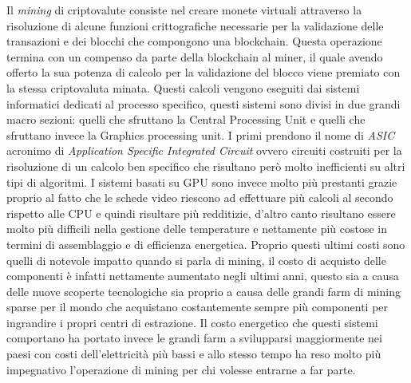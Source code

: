 \documentclass[
11pt, %
oneside, %
english, %
onehalfspacing,%
headsepline, %
]{MastersDoctoralThesis} %
\begin{document}
Il \emph{mining} di criptovalute consiste nel creare monete virtuali attraverso la risoluzione di alcune funzioni crittografiche necessarie per la validazione delle transazioni e dei blocchi che compongono una blockchain. Questa operazione termina con un compenso da parte della blockchain al miner, il quale avendo offerto la sua potenza di calcolo per la validazione del blocco viene premiato con la stessa criptovaluta minata. Questi calcoli vengono eseguiti dai sistemi informatici dedicati al processo specifico, questi sistemi sono divisi in due grandi macro sezioni: quelli che sfruttano la Central Processing Unit e quelli che sfruttano invece la Graphics processing unit. I primi prendono il nome di \emph{ASIC} acronimo di \emph{Application Specific Integrated Circuit} ovvero circuiti costruiti per la risoluzione di un calcolo ben specifico che risultano però molto inefficienti su altri tipi di algoritmi. I sistemi basati su GPU sono invece molto più prestanti grazie proprio al fatto che le schede video riescono ad effettuare più calcoli al secondo rispetto alle CPU e quindi risultare più redditizie, d'altro canto risultano essere molto più difficili nella gestione delle temperature e nettamente più costose in termini di assemblaggio e di efficienza energetica. Proprio questi ultimi costi sono quelli di notevole impatto quando si parla di mining, il costo di acquisto delle componenti è infatti nettamente aumentato negli ultimi anni, questo sia a causa delle nuove scoperte tecnologiche sia proprio a causa delle grandi farm di mining sparse per il mondo che acquistano costantemente sempre più componenti per ingrandire i propri centri di estrazione. Il costo energetico che questi sistemi comportano ha portato invece le grandi farm a svilupparsi maggiormente nei paesi con costi dell'elettricità più bassi e allo stesso tempo ha reso molto più impegnativo l'operazione di mining per chi volesse entrarne a far parte.\\
\end{document}
